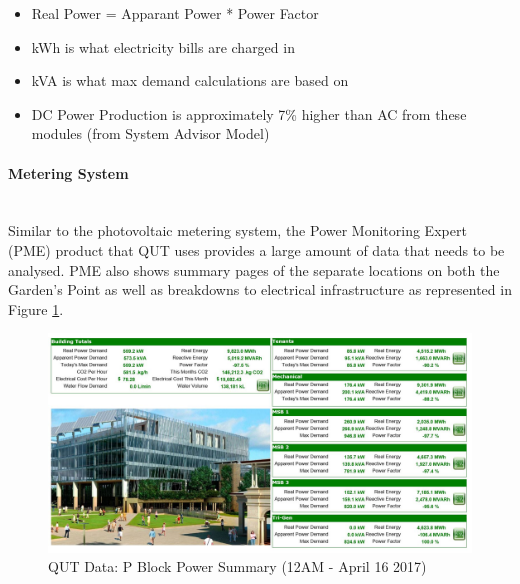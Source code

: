 \begin{itemize}[noitemsep,nolistsep]
	\item Real Power = Apparant Power * Power Factor
	\item kWh is what electricity bills are charged in
	\item kVA is what max demand calculations are based on
	\item DC Power Production is approximately 7\% higher than AC from these modules (from System Advisor Model)
\end{itemize} 
 
\paragraph{Metering System}
~~\\
Similar to the photovoltaic metering system, the Power Monitoring Expert (PME) product that QUT uses provides a large amount of data that needs to be analysed. PME also shows summary pages of the separate locations on both the Garden's Point as well as breakdowns to electrical infrastructure as represented in Figure \ref{fig:qut-pme-pblock-summary}. 

\begin{figure}[H]
	\hfill\includegraphics[width = 150mm]{images/metering/pme/pme-p-block-summary-page}\hspace*{\fill}
	\caption{QUT Data: P Block Power Summary (12AM - April 16 2017)} 
	\label{fig:qut-pme-pblock-summary}
\end{figure} 

